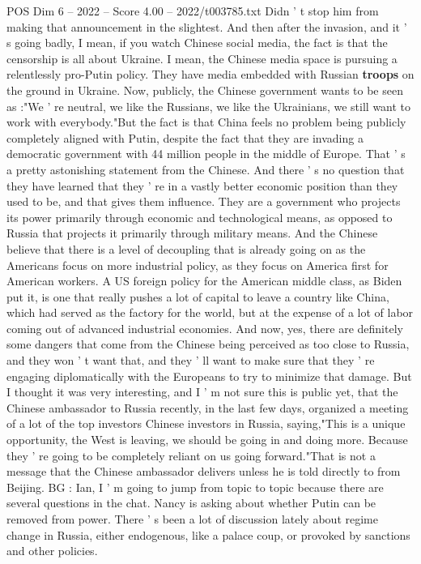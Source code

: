 \begin{textsample}{POS Dim 6 – 2022 – Score 4.00 – 2022/t003785.txt}
Didn ' t stop him from making that announcement in the slightest.
And then after the invasion, and it ' s going badly, I mean, if you watch Chinese social media, the fact is that the censorship is all about Ukraine.
I mean, the Chinese media space is pursuing a relentlessly pro-Putin policy.
They have media embedded with Russian \textbf{troops} on the ground in Ukraine.
Now, publicly, the Chinese government wants to be seen as :"We ' re neutral, we like the Russians, we like the Ukrainians, we still want to work with everybody."But the fact is that China feels no problem being publicly completely aligned with Putin, despite the fact that they are invading a democratic government with 44 million people in the middle of Europe.
That ' s a pretty astonishing statement from the Chinese.
And there ' s no question that they have learned that they ' re in a vastly better economic position than they used to be, and that gives them influence.
They are a government who projects its power primarily through economic and technological means, as opposed to Russia that projects it primarily through military means.
And the Chinese believe that there is a level of decoupling that is already going on as the Americans focus on more industrial policy, as they focus on America first for American workers.
A US foreign policy for the American middle class, as Biden put it, is one that really pushes a lot of capital to leave a country like China, which had served as the factory for the world, but at the expense of a lot of labor coming out of advanced industrial economies.
And now, yes, there are definitely some dangers that come from the Chinese being perceived as too close to Russia, and they won ' t want that, and they ' ll want to make sure that they ' re engaging diplomatically with the Europeans to try to minimize that damage.
But I thought it was very interesting, and I ' m not sure this is public yet, that the Chinese ambassador to Russia recently, in the last few days, organized a meeting of a lot of the top investors Chinese investors in Russia, saying,"This is a unique opportunity, the West is leaving, we should be going in and doing more.
Because they ' re going to be completely reliant on us going forward."That is not a message that the Chinese ambassador delivers unless he is told directly to from Beijing.
BG : Ian, I ' m going to jump from topic to topic because there are several questions in the chat.
Nancy is asking about whether Putin can be removed from power.
There ' s been a lot of discussion lately about regime change in Russia, either endogenous, like a palace coup, or provoked by sanctions and other policies.

\end{textsample}
